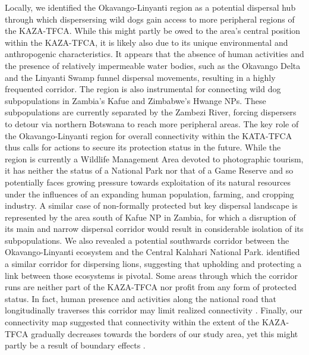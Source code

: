 \documentclass[abstract=on,10pt,a4paper,bibliography=totocnumbered]{article}
\begin{document}
Locally, we identified the Okavango-Linyanti region as a potential dispersal hub
through which dispersersing wild dogs gain access to more peripheral regions of
the KAZA-TFCA. While this might partly be owed to the area's central position
within the KAZA-TFCA, it is likely also due to its unique environmental and
anthropogenic characteristics. It appears that the absence of human activities
and the presence of relatively impermeable water bodies, such as the Okavango
Delta and the Linyanti Swamp funnel dispersal movements, resulting in a highly
frequented corridor. The region is also instrumental for connecting wild dog
subpopulations in Zambia's Kafue and Zimbabwe's Hwange NPs. These subpopulations
are currently separated by the Zambezi River, forcing dispersers to detour via
northern Botswana to reach more peripheral areas. The key role of the
Okavango-Linyanti region for overall connectivity within the KATA-TFCA thus
calls for actions to secure its protection status in the future. While the
region is currently a Wildlife Management Area devoted to photographic tourism,
it has neither the status of a National Park nor that of a Game Reserve and so
potentially faces growing pressure towards exploitation of its natural resources
under the influences of an expanding human population, farming, and cropping
industry. A similar case of non-formally protected but key dispersal landscape
is represented by the area south of Kafue NP in Zambia, for which a disruption
of its main and narrow dispersal corridor would result in considerable isolation
of its subpopulations. We also revealed a potential southwards corridor between
the Okavango-Linyanti ecosystem and the Central Kalahari National Park.
\cite{Elliot.2014} identified a similar corridor for dispersing lions,
suggesting that upholding and protecting a link between those ecosystems is
pivotal. Some areas through which the corridor runs are neither part of the
KAZA-TFCA nor profit from any form of protected status. In fact, human presence
and activities along the national road that longitudinally traverses this
corridor may limit realized connectivity \citep{Cozzi.2020}. Finally, our
connectivity map suggested that connectivity within the extent of the KAZA-TFCA
gradually decreases towards the borders of our study area, yet this might partly
be a result of boundary effects \citep{Koen.2010}.

\end{document}
